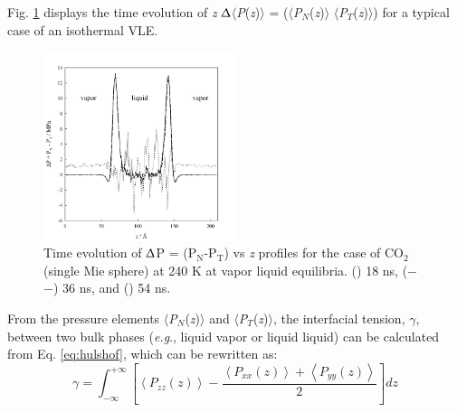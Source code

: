 \documentclass[9pt,bestpractices]{livecoms}
\begin{document}
Fig. \ref{fig:17} displays the time evolution of \textit{z} \textendash{}
${\Updelta}$${\langle}$\textit{P}(\textit{z})${\rangle}$
= (${\langle}$\textit{P}$_{N}$(\textit{z})${\rangle}$ \textendash{}
${\langle}$\textit{P}$_{T}$(\textit{z})${\rangle}$) for a typical case of an
isothermal VLE. 
\begin{figure}
\includegraphics[width=0.5\textwidth]{gfx/image61.jpeg}
\caption{Time evolution of {${\Updelta}$}P = (P$_{\mathrm{N}}$-P$_{\mathrm{T}}$) vs \textit{z} profiles for the case of CO$_{2}$ (single Mie sphere) at 240 K at vapor \textendash{} liquid equilibria. ({\textbullet}{\textbullet}{\textbullet}) 18 ns, (${-}$ ${-}$) 36 ns, and (\textemdash) 54 ns.}
\label{fig:17}
\end{figure}
From the pressure elements ${\langle}$\textit{P}$_{N}$(\textit{z})${\rangle}$
and ${\langle}$\textit{P}$_{T}$(\textit{z})${\rangle}$, the interfacial
tension, ${\gamma}$, between two bulk phases (\textit{e.g}., liquid
\textendash{} vapor or liquid \textendash{} liquid) can be calculated from Eq.
\ref{eq:hulshof}, which can be rewritten as:
\begin{equation}
\gamma=\int_{{\scriptstyle -\infty}}^{{\scriptstyle +\infty}}\left[\left\langle P_{zz}\left(z\right)\right\rangle -\frac{\left\langle P_{xx}\left(z\right)\right\rangle +\left\langle P_{yy}\left(z\right)\right\rangle }{2}\right]dz
  \label{eq:12}
\end{equation}
\end{document}
